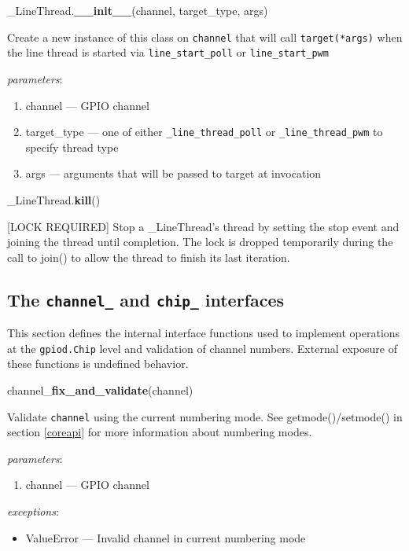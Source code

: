 \documentclass[12pt]{article}
\begin{document}
\noindent \_LineThread.\textbf{\_\_init\_\_}(channel, target\_type, args)
        
Create a new instance of this class on \texttt{channel} that will call \texttt{target(*args)} when the line thread is started via \texttt{line\_start\_poll} or \texttt{line\_start\_pwm}

\textit{parameters}:
\begin{enumerate}
        \item channel --- GPIO channel
	\item target\_type --- one of either \texttt{\_line\_thread\_poll} or \texttt{\_line\_thread\_pwm} to specify thread type
        \item args --- arguments that will be passed to target at invocation
\end{enumerate}
 

\noindent \_LineThread.\textbf{kill}()

[LOCK REQUIRED] Stop a \_LineThread's thread by setting the stop event and joining the thread until completion.
The lock is dropped temporarily during the call to join() to allow the thread to finish its last iteration.

\subsection{The  \texttt{channel\_} and \texttt{chip\_} interfaces}

This section defines the internal interface functions used to implement operations at the \texttt{gpiod.Chip} level and validation of channel numbers. External exposure of these functions is undefined behavior.

\medskip

\noindent channel\_\textbf{fix\_and\_validate}(channel)

Validate \texttt{channel} using the current numbering mode.
See getmode()/setmode() in section \ref{coreapi} for more information about numbering modes.

\textit{parameters}:
\begin{enumerate}      
        \item channel --- GPIO channel
\end{enumerate}
 
 
\textit{exceptions}:
\begin{itemize}
    \item ValueError --- Invalid channel in current numbering mode
\end{itemize}
\end{document}
